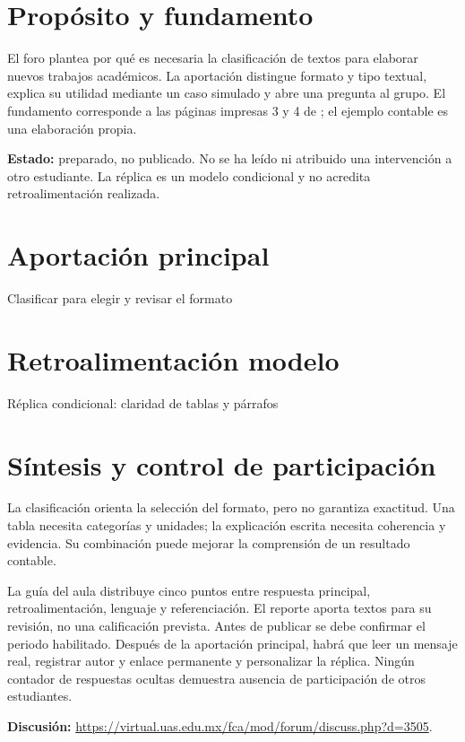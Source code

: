 


\section{Propósito y fundamento}
El foro plantea por qué es necesaria la clasificación de textos para elaborar nuevos trabajos académicos. La aportación distingue formato y tipo textual, explica su utilidad mediante un caso simulado y abre una pregunta al grupo. El fundamento corresponde a las páginas impresas 3 y 4 de \textcite{gracida2012}; el ejemplo contable es una elaboración propia.

\noindent\textbf{Estado:} preparado, no publicado. No se ha leído ni atribuido una intervención a otro estudiante. La réplica es un modelo condicional y no acredita retroalimentación realizada.

\section{Aportación principal}
\begin{forobox}{Clasificar para elegir y revisar el formato}

\end{forobox}

\section{Retroalimentación modelo}
\begin{forobox}{Réplica condicional: claridad de tablas y párrafos}

\end{forobox}

\section{Síntesis y control de participación}
La clasificación orienta la selección del formato, pero no garantiza exactitud. Una tabla necesita categorías y unidades; la explicación escrita necesita coherencia y evidencia. Su combinación puede mejorar la comprensión de un resultado contable.

La guía del aula distribuye cinco puntos entre respuesta principal, retroalimentación, lenguaje y referenciación. El reporte aporta textos para su revisión, no una calificación prevista. Antes de publicar se debe confirmar el periodo habilitado. Después de la aportación principal, habrá que leer un mensaje real, registrar autor y enlace permanente y personalizar la réplica. Ningún contador de respuestas ocultas demuestra ausencia de participación de otros estudiantes.

\noindent\textbf{Discusión:} \url{https://virtual.uas.edu.mx/fca/mod/forum/discuss.php?d=3505}.
